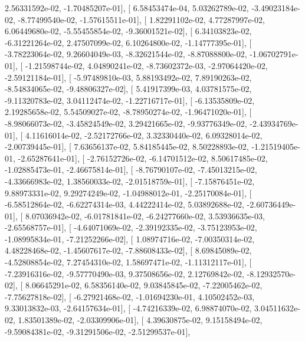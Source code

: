 \documentclass{article}
\begin{document}
          2.56331592e-02,  -1.70485207e-01],
       [  6.58453474e-04,   5.03262789e-02,  -3.49023184e-02,
         -8.77499540e-02,  -1.57615511e-01],
       [  1.82291102e-02,   4.77287997e-02,   6.06449680e-02,
         -5.55455854e-02,  -9.36001521e-02],
       [  6.34103823e-02,  -6.31221264e-02,   2.47507099e-02,
          6.10264800e-02,  -1.14777395e-01],
       [ -3.78223064e-02,   9.26604049e-03,  -8.32621544e-02,
         -8.87088800e-02,  -1.06702791e-01],
       [ -1.21598744e-02,   4.04890241e-02,  -8.73602372e-03,
         -2.97064420e-02,  -2.59121184e-01],
       [ -5.97489810e-03,   5.88193492e-02,   7.89190263e-02,
         -8.54834065e-02,  -9.48806327e-02],
       [  5.41917399e-03,   4.03781575e-02,  -9.11320783e-02,
          3.04112474e-02,  -1.22716717e-01],
       [ -6.13535809e-02,   2.19285658e-02,   5.54509027e-02,
         -8.78950274e-02,  -1.96471020e-01],
       [ -8.98066073e-02,  -3.45824549e-02,   3.29421665e-02,
         -9.93776349e-02,  -2.43934769e-01],
       [  4.11616014e-02,  -2.52172766e-02,   3.32330440e-02,
          6.09328014e-02,  -2.00739445e-01],
       [  7.63656137e-02,   5.84185445e-02,   8.50228893e-02,
         -1.21519405e-01,  -2.65287641e-01],
       [ -2.76152726e-02,  -6.14701512e-02,   8.50617485e-02,
         -1.02885473e-01,  -2.46675814e-01],
       [ -8.76790107e-02,  -7.45013215e-02,  -4.33666983e-02,
          1.38560033e-02,  -2.01518759e-01],
       [ -7.15876451e-02,   9.88973331e-02,   9.29274249e-02,
         -1.04988012e-01,  -2.25170084e-01],
       [ -6.58512864e-02,  -6.62274314e-03,   4.44222414e-02,
          5.03892688e-02,  -2.60736449e-01],
       [  8.07036942e-02,  -6.01781841e-02,  -6.24277660e-02,
          3.53936635e-03,  -2.65568757e-01],
       [ -4.64071069e-02,  -2.39192335e-02,  -3.75123953e-02,
         -1.08995834e-01,  -7.21252266e-02],
       [  1.08974716e-02,  -7.00350314e-02,   4.48228468e-02,
         -1.45607617e-02,  -7.88608433e-02],
       [  8.69845089e-02,  -4.52808854e-02,   7.27454310e-02,
          1.58697471e-02,  -1.11312117e-01],
       [ -7.23916316e-02,  -9.57770490e-03,   9.37508656e-02,
          2.12769842e-02,  -8.12932570e-02],
       [  8.06645291e-02,   6.58356140e-02,   9.03845845e-02,
         -7.22005462e-02,  -7.75627818e-02],
       [ -6.27921468e-02,  -1.01694230e-01,   4.10502452e-03,
          9.33013832e-03,  -2.64157634e-01],
       [ -4.74216339e-02,   6.98874070e-02,   3.04511632e-02,
          1.83501389e-02,  -2.03309906e-01],
       [  4.39630875e-02,   9.15158494e-02,  -9.59084381e-02,
         -9.31291506e-02,  -2.51299537e-01],
\end{document}
